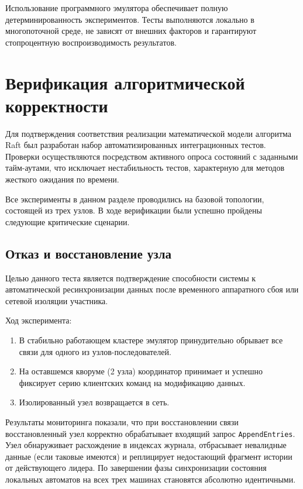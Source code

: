 Использование программного эмулятора обеспечивает полную детерминированность экспериментов. Тесты выполняются локально в многопоточной среде, не зависят от внешних факторов и гарантируют стопроцентную воспроизводимость результатов.

\section{Верификация алгоритмической корректности}

Для подтверждения соответствия реализации математической модели алгоритма Raft был разработан набор автоматизированных интеграционных тестов. Проверки осуществляются посредством активного опроса состояний с заданными тайм-аутами, что исключает нестабильность тестов, характерную для методов жесткого ожидания по времени.

Все эксперименты в данном разделе проводились на базовой топологии, состоящей из трех узлов. В ходе верификации были успешно пройдены следующие критические сценарии.

\subsection{Отказ и восстановление узла}

Целью данного теста является подтверждение способности системы к автоматической ресинхронизации данных после временного аппаратного сбоя или сетевой изоляции участника.

Ход эксперимента:
\begin{enumerate}
    \item В стабильно работающем кластере эмулятор принудительно обрывает все связи для одного из узлов-последователей.
    \item На оставшемся кворуме (2 узла) координатор принимает и успешно фиксирует серию клиентских команд на модификацию данных.
    \item Изолированный узел возвращается в сеть.
\end{enumerate}

Результаты мониторинга показали, что при восстановлении связи восстановленный узел корректно обрабатывает входящий запрос \texttt{AppendEntries}. Узел обнаруживает расхождение в индексах журнала, отбрасывает невалидные данные (если таковые имеются) и реплицирует недостающий фрагмент истории от действующего лидера. По завершении фазы синхронизации состояния локальных автоматов на всех трех машинах становятся абсолютно идентичными.

